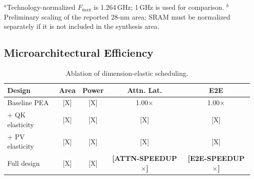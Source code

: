 \documentclass[conference]{IEEEtran}
\newcommand{\AttentionSpeedup}{\textbf{[ATTN-SPEEDUP$\times$]}}
\newcommand{\EtoESpeedup}{\textbf{[E2E-SPEEDUP$\times$]}}
\begin{document}
\begin{table}[t]
\centering
\caption{Implementation parameters and 7-nm normalization.}
\label{tab:hw_comparison}
\footnotesize
\setlength{\tabcolsep}{2.4pt}
\renewcommand{\arraystretch}{1.05}
\vspace{1pt}
\parbox{\columnwidth}{\scriptsize
$^{a}$Technology-normalized $F_{\max}$ is 1.264\,GHz; 1\,GHz is used for
comparison. $^{b}$Preliminary scaling of the reported 28-nm area; SRAM must be
normalized separately if it is not included in the synthesis area.}
\end{table}

\subsection{Microarchitectural Efficiency}

\begin{table}[t]
\centering
\caption{Ablation of dimension-elastic scheduling.}
\label{tab:hardware}
\setlength{\tabcolsep}{3.0pt}
\begin{tabular}{lcccc}
\toprule
Design & Area & Power & Attn. Lat. & E2E \\
\midrule
Baseline PEA & [X] & [X] & 1.00$\times$ & 1.00$\times$ \\
+ QK elasticity & [X] & [X] & [X] & [X] \\
+ PV elasticity & [X] & [X] & [X] & [X] \\
Full design & [X] & [X] & \AttentionSpeedup & \EtoESpeedup \\
\bottomrule
\end{tabular}
\end{table}
\end{document}
